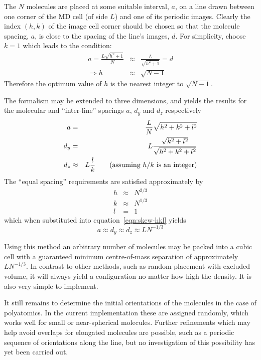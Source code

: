 \documentclass[a4paper,twoside]{report}
\begin{document}
The $N$ molecules are placed at some suitable interval, $a$, on a line
drawn between one corner of the MD cell (of side $L$) and one of its
periodic images.  Clearly the index $(h,k)$ of the image cell corner
should be chosen so that the molecule spacing, $a$, is close to the
spacing of the line's images, $d$. For simplicity, choose $k=1$ which
leads to the condition:
\begin{eqnarray}
\nonumber
a = \frac{L \sqrt{h^2+1}}{N} &\approx& \frac{L}{\sqrt{h^2+1}} = d \\
 \Rightarrow h &\approx& \sqrt{N-1}
\end{eqnarray}
Therefore the optimum value of $h$ is the nearest integer to
$\sqrt{N-1}$.  

The formalism may be extended to three dimensions, and yields the
results for the molecular and ``inter-line'' spacings $a$, $d_y$ and
$d_z$ respectively
\begin{eqnarray}
\label{eqn:skew-hkl}
\nonumber
a & = & \frac{L}{N}\sqrt{h^2+k^2+l^2}\\
d_y  & = & L \frac{\sqrt{k^2+l^2}}{\sqrt{h^2+k^2+l^2}} \\
d_z & \approx & L\frac{l}{k} \qquad\textnormal{(assuming $h/k$ is an integer)}
\nonumber
\end{eqnarray}
The ``equal spacing'' requirements are satisfied approximately by
\begin{eqnarray}
  \nonumber
  h & \approx & N^{2/3} \\
  k & \approx & N^{1/3} \\
  \nonumber
  l & = & 1
\end{eqnarray}
which when substituted into equation~\ref{eqn:skew-hkl} yields
\begin{equation}
  a \approx d_y \approx d_z \approx LN^{-1/3}
\end{equation}

Using this method an arbitrary number of molecules may be packed into
a cubic cell with a guaranteed minimum centre-of-mass separation of
approximately $LN^{-1/3}$.  In contrast to other methods, such as
random placement with excluded volume, it will always yield a
configuration no matter how high the density.  It is also very simple
to implement.

It still remains to determine the initial orientations of the
molecules in the case of polyatomics.  In the current implementation
these are assigned randomly, which works well for small or
near-spherical molecules.  Further refinements which may help avoid
overlaps for elongated molecules are possible, such as a periodic
sequence of orientations along the line, but no investigation of this
possibility has yet been carried out.
\end{document}
